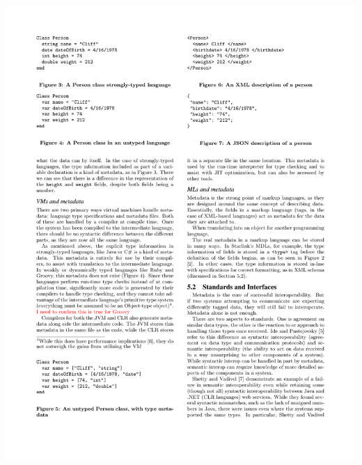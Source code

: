 \documentclass{beamer}
\begin{document}
\begin{frame}
\begin{columns}
\begin{column}{0.5\textwidth}
   \includegraphics[scale=1]{graphics/JSONCliff.pdf}
  \end{column}
  \end{columns}
  
\end{frame}
\end{document}
